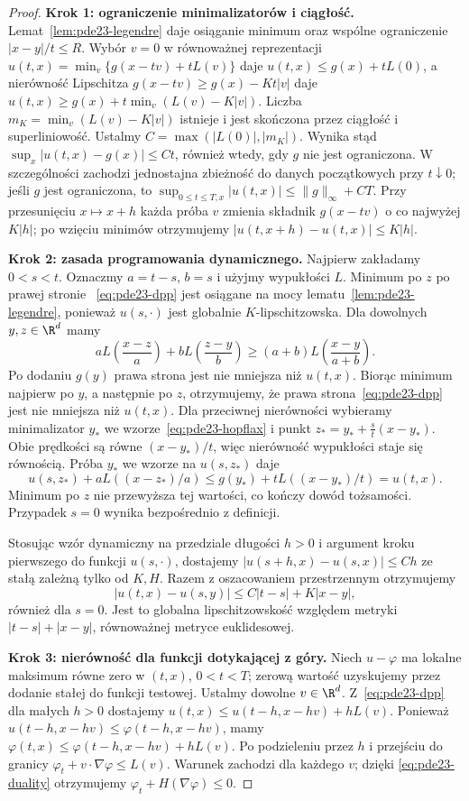 \begin{proof}
\textbf{Krok 1: ograniczenie minimalizatorów i ciągłość.}
Lemat~\ref{lem:pde23-legendre} daje osiąganie minimum
oraz wspólne ograniczenie $|x-y|/t\le R$.
Wybór $v=0$ w równoważnej reprezentacji
$u(t,x)=\min_v\{g(x-tv)+tL(v)\}$ daje
$u(t,x)\le g(x)+tL(0)$, a nierówność Lipschitza
$g(x-tv)\ge g(x)-Kt|v|$ daje
$u(t,x)\ge g(x)+t\min_v(L(v)-K|v|)$.
Liczba $m_K=\min_v(L(v)-K|v|)$ istnieje
i jest skończona przez ciągłość i superliniowość.
Ustalmy $C=\max(|L(0)|,|m_K|)$.
Wynika stąd $\sup_x|u(t,x)-g(x)|\le Ct$,
również wtedy, gdy $g$ nie jest ograniczona.
W szczególności zachodzi jednostajna zbieżność
do danych początkowych przy $t\downarrow0$;
jeśli $g$ jest ograniczona, to
$\sup_{0\le t\le T,x}|u(t,x)|\le\|g\|_\infty+CT$.
Przy przesunięciu $x\mapsto x+h$ każda próba $v$
zmienia składnik $g(x-tv)$ o co najwyżej $K|h|$;
po wzięciu minimów otrzymujemy
$|u(t,x+h)-u(t,x)|\le K|h|$.

\textbf{Krok 2: zasada programowania dynamicznego.}
Najpierw zakładamy $0<s<t$.
Oznaczmy $a=t-s$, $b=s$ i użyjmy wypukłości $L$.
Minimum po $z$ po prawej stronie
~\eqref{eq:pde23-dpp} jest osiągane na mocy
lematu~\ref{lem:pde23-legendre}, ponieważ
$u(s,\cdot)$ jest globalnie $K$-lipschitzowska.
Dla dowolnych $y,z\in\R^d$ mamy
\[
 aL\!\left(\frac{x-z}{a}\right)
 +bL\!\left(\frac{z-y}{b}\right)
 \ge (a+b)L\!\left(\frac{x-y}{a+b}\right).
\]
Po dodaniu $g(y)$ prawa strona jest nie mniejsza
niż $u(t,x)$. Biorąc minimum najpierw po $y$,
a następnie po $z$, otrzymujemy, że prawa
strona~\eqref{eq:pde23-dpp} jest nie mniejsza
niż $u(t,x)$.
Dla przeciwnej nierówności wybieramy minimalizator
$y_*$ we wzorze~\eqref{eq:pde23-hopflax} i punkt
$z_*=y_*+\frac{s}{t}(x-y_*)$.
Obie prędkości są równe $(x-y_*)/t$, więc
nierówność wypukłości staje się równością.
Próba $y_*$ we wzorze na $u(s,z_*)$ daje
\[
 u(s,z_*)+aL((x-z_*)/a)
 \le g(y_*)+tL((x-y_*)/t)=u(t,x).
\]
Minimum po $z$ nie przewyższa tej wartości,
co kończy dowód tożsamości.
Przypadek $s=0$ wynika bezpośrednio z definicji.

Stosując wzór dynamiczny na przedziale długości $h>0$
i argument kroku pierwszego do funkcji $u(s,\cdot)$,
dostajemy $|u(s+h,x)-u(s,x)|\le Ch$ ze stałą
zależną tylko od $K,H$. Razem z oszacowaniem przestrzennym otrzymujemy
\[
 |u(t,x)-u(s,y)|\le C|t-s|+K|x-y|,
\]
również dla $s=0$.
Jest to globalna lipschitzowskość względem
metryki $|t-s|+|x-y|$, równoważnej metryce euklidesowej.

\textbf{Krok 3: nierówność dla funkcji dotykającej z góry.}
Niech $u-\varphi$ ma lokalne maksimum równe zero
w $(t,x)$, $0<t<T$; zerową wartość uzyskujemy
przez dodanie stałej do funkcji testowej. Ustalmy dowolne $v\in\R^d$.
Z~\eqref{eq:pde23-dpp} dla małych $h>0$ dostajemy
$u(t,x)\le u(t-h,x-hv)+hL(v)$.
Ponieważ $u(t-h,x-hv)\le\varphi(t-h,x-hv)$,
mamy $\varphi(t,x)\le\varphi(t-h,x-hv)+hL(v)$.
Po podzieleniu przez $h$ i przejściu do granicy
$\varphi_t+v\cdot\nabla\varphi\le L(v)$.
Warunek zachodzi dla każdego $v$; dzięki
\eqref{eq:pde23-duality} otrzymujemy
$\varphi_t+H(\nabla\varphi)\le0$.


\end{proof}

